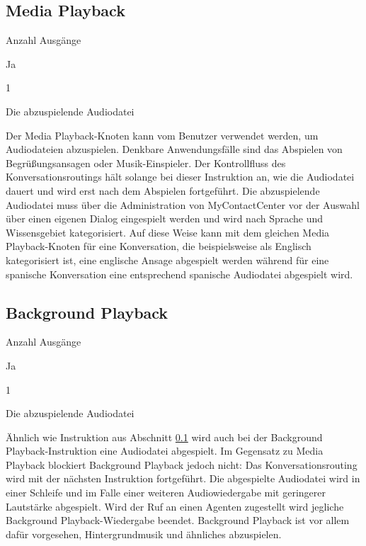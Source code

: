 \subsection{Media Playback}
\label{subsec:Media Playback}
\begin{labeling}{Anzahl Ausgänge}
\item [Eingang] Ja
\item [Anzahl Ausgänge] 1
\item [Parameter] Die abzuspielende Audiodatei
\item [Beschreibung] Der Media Playback-Knoten kann vom Benutzer verwendet werden, um Audiodateien abzuspielen. Denkbare Anwendungsfälle sind das Abspielen von Begrüßungsansagen oder Musik-Einspieler. Der Kontrollfluss des Konversationsroutings hält solange bei dieser Instruktion an, wie die Audiodatei dauert und wird erst nach dem Abspielen fortgeführt.  Die abzuspielende Audiodatei muss über die Administration von MyContactCenter vor der Auswahl über einen eigenen Dialog eingespielt werden und wird nach Sprache und Wissensgebiet kategorisiert. Auf diese Weise kann mit dem gleichen Media Playback-Knoten für eine Konversation, die beispielsweise als Englisch kategorisiert ist, eine englische Ansage abgespielt werden während für eine spanische Konversation eine entsprechend spanische Audiodatei abgespielt wird.
\end{labeling}

\subsection{Background Playback}
\begin{labeling}{Anzahl Ausgänge}
\item [Eingang] Ja
\item [Anzahl Ausgänge] 1
\item [Parameter] Die abzuspielende Audiodatei
\item [Beschreibung] Ähnlich wie Instruktion aus Abschnitt \ref{subsec:Media Playback} wird auch bei der Background Playback-Instruktion eine Audiodatei abgespielt. Im Gegensatz zu Media Playback blockiert Background Playback jedoch nicht: Das Konversationsrouting wird mit der nächsten Instruktion fortgeführt. Die abgespielte Audiodatei wird in einer Schleife und im Falle einer weiteren Audiowiedergabe mit geringerer Lautstärke abgespielt. Wird der Ruf an einen Agenten zugestellt wird jegliche Background Playback-Wiedergabe beendet. Background Playback ist vor allem dafür vorgesehen, Hintergrundmusik und ähnliches abzuspielen.
\end{labeling}

